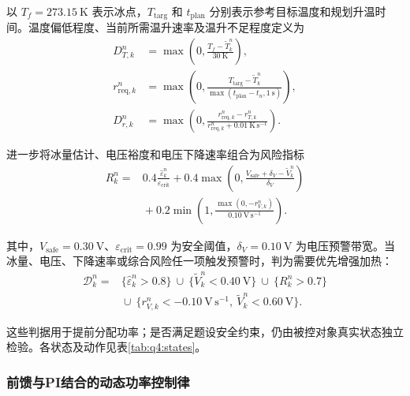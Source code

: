 \documentclass[bwprint]{gmcmthesis}
\numberwithin{equation}{section}
\numberwithin{figure}{section}
\begin{document}
以 $T_f=273.15\ \mathrm K$ 表示冰点，$T_{\mathrm{targ}}$ 和 $t_{\mathrm{plan}}$ 分别表示参考目标温度和规划升温时间。温度偏低程度、当前所需温升速率及温升不足程度定义为
\begin{equation}
\begin{aligned}
D_{T,k}^n&=\max\!\left(0,\frac{T_f-\widetilde T_k^n}{30\ \mathrm K}\right),\\
r_{\mathrm{req},k}^n&=\max\!\left(0,\frac{T_{\mathrm{targ}}-\widetilde T_k^n}
{\max(t_{\mathrm{plan}}-t_n,1\ \mathrm s)}\right),\\
D_{r,k}^n&=\max\!\left(0,\frac{r_{\mathrm{req},k}^n-r_{T,k}^n}
{r_{\mathrm{req},k}^n+0.01\ \mathrm{K\,s^{-1}}}\right).
\end{aligned}
\label{eq:q4:temperature_deficit}
\end{equation}

进一步将冰量估计、电压裕度和电压下降速率组合为风险指标
\begin{equation}
\begin{aligned}
R_k^n={}&0.4\frac{\widehat\varepsilon_k^n}{\varepsilon_{\mathrm{crit}}}
+0.4\max\!\left(0,\frac{V_{\mathrm{safe}}+\delta_V-\widetilde V_k^n}{\delta_V}\right)
\\
&{}+0.2\min\!\left(1,\frac{\max(0,-r_{V,k}^n)}{0.10\ \mathrm{V\,s^{-1}}}\right).
\end{aligned}
\label{eq:q4:ice_risk}
\end{equation}

其中，$V_{\mathrm{safe}}=0.30\ \mathrm V$、$\varepsilon_{\mathrm{crit}}=0.99$ 为安全阈值，$\delta_V=0.10\ \mathrm V$ 为电压预警带宽。当冰量、电压、下降速率或综合风险任一项触发预警时，判为需要优先增强加热：
\begin{equation}
\begin{aligned}
\mathcal D_k^n={}&
\big\{\widehat\varepsilon_k^n>0.8\big\}
\ \cup\ \big\{\widetilde V_k^n<0.40\ \mathrm V\big\}
\ \cup\ \big\{R_k^n>0.7\big\}\\
&{}\cup\ \big\{r_{V,k}^n<-0.10\ \mathrm{V\,s^{-1}},\
\widetilde V_k^n<0.60\ \mathrm V\big\}.
\end{aligned}
\label{eq:q4:danger_condition}
\end{equation}

这些判据用于提前分配功率；是否满足题设安全约束，仍由被控对象真实状态独立检验。各状态及动作见表\ref{tab:q4:states}。

\subsubsection{前馈与PI结合的动态功率控制律}
\end{document}
